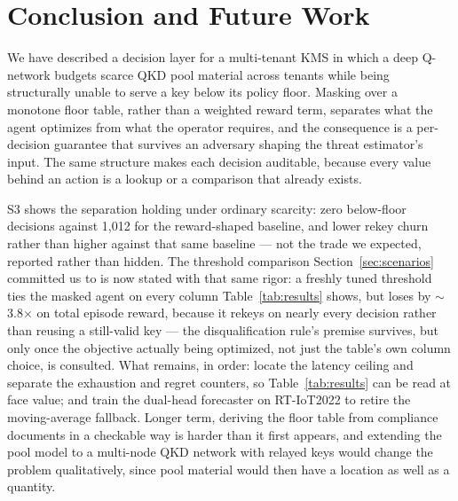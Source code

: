 \documentclass[conference]{IEEEtran}
\begin{document}
\section{Conclusion and Future Work}

We have described a decision layer for a multi-tenant KMS
in which a deep Q-network budgets scarce QKD pool material
across tenants while being structurally unable to serve a key
below its policy floor. Masking over a monotone floor table,
rather than a weighted reward term, separates what the agent
optimizes from what the operator requires, and the consequence is a per-decision guarantee that survives an adversary
shaping the threat estimator's input. The same structure makes
each decision auditable, because every value behind an action
is a lookup or a comparison that already exists.

S3 shows the separation holding under ordinary scarcity:
zero below-floor decisions against 1,012 for the reward-shaped
baseline, and lower rekey churn rather than higher against
that same baseline --- not the trade we expected, reported rather
than hidden. The threshold comparison Section~\ref{sec:scenarios}
committed us to is now stated with that same rigor: a freshly
tuned threshold ties the masked agent on every column
Table~\ref{tab:results} shows, but loses by $\sim$3.8$\times$ on
total episode reward, because it rekeys on nearly every decision
rather than reusing a still-valid key --- the disqualification
rule's premise survives, but only once the objective actually
being optimized, not just the table's own column choice, is
consulted. What remains, in order: locate the latency ceiling and
separate the exhaustion and regret counters, so Table~\ref{tab:results}
can be read at face value; and train the
dual-head forecaster on RT-IoT2022 to retire the moving-average
fallback. Longer term, deriving the floor table from compliance
documents in a checkable way is harder than it first appears,
and extending the pool model to a multi-node QKD network
with relayed keys would change the problem qualitatively,
since pool material would then have a location as well as a
quantity.
\end{document}
